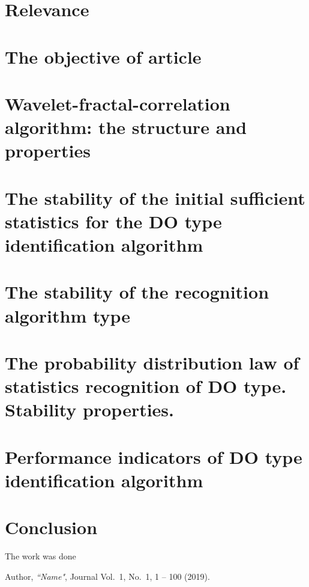 \documentclass[
11pt,%
tightenlines,%
twoside,%
onecolumn,%
nofloats,%
nobibnotes,%
nofootinbib,%
superscriptaddress,%
noshowpacs,%
centertags]%
{revtex4}
\begin{document}


\maketitle


\section{Relevance}



\section{The objective of article}



\section{Wavelet-fractal-correlation algorithm: the structure and properties}



\section{The stability of the initial sufficient statistics for the DO type identification algorithm}



\section{The stability of the recognition algorithm type}



\section{The probability distribution law of statistics recognition of DO type. Stability properties.}



\section{Performance indicators of DO type identification algorithm}



\section{Conclusion}



\begin{acknowledgments}
The work was done
\end{acknowledgments}

\begin{thebibliography}{99}

Author, {\it ``Name"}, Journal Vol.~1, No.~1, 1 -- 100 (2019).

\end{thebibliography}
\end{document}

